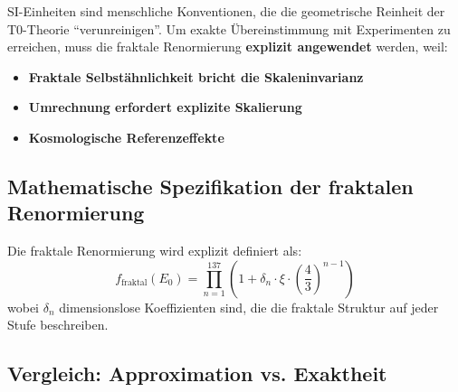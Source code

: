 \documentclass[12pt,a4paper]{article}
\begin{document}
	SI-Einheiten sind menschliche Konventionen, die die geometrische Reinheit der T0-Theorie ``verunreinigen''. Um exakte Übereinstimmung mit Experimenten zu erreichen, muss die fraktale Renormierung \textbf{explizit angewendet} werden, weil:
	
	\begin{itemize}
		\item \textbf{Fraktale Selbstähnlichkeit bricht die Skaleninvarianz}
		\item \textbf{Umrechnung erfordert explizite Skalierung}
		\item \textbf{Kosmologische Referenzeffekte}
	\end{itemize}
	
	\subsection{Mathematische Spezifikation der fraktalen Renormierung}
	
	Die fraktale Renormierung wird explizit definiert als:
	\begin{equation}
		f_{\text{fraktal}}(E_0) = \prod_{n=1}^{137} \left(1 + \delta_n \cdot \xi \cdot \left(\frac{4}{3}\right)^{n-1}\right)
	\end{equation}
	wobei $\delta_n$ dimensionslose Koeffizienten sind, die die fraktale Struktur auf jeder Stufe beschreiben.
	
	\subsection{Vergleich: Approximation vs. Exaktheit}
	
\end{document}
